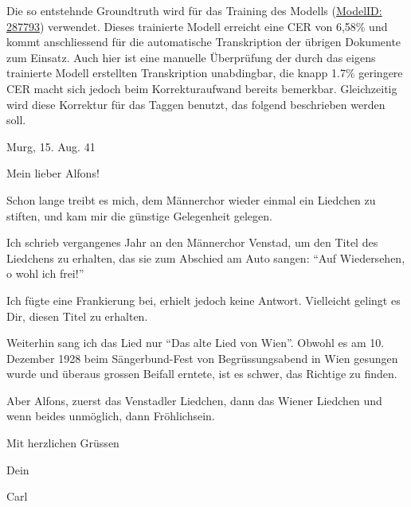 \documentclass[12pt, a4paper, ngerman, bidi=default]{article}
\let\cite\footcite
\begin{document}
\begin{minipage}[t]{0.52\textwidth}
  \justifying
  \noindent
Die so entstehnde Groundtruth wird für das Training des Modells
(\href{https://app.transkribus.org/models/public/287793}{ModelID: 287793})\footnotemark{} verwendet.
Dieses trainierte Modell erreicht eine CER von 6,58\% und kommt anschliessend für die automatische Transkription der übrigen Dokumente zum Einsatz. Auch hier ist eine manuelle Überprüfung der durch das eigens trainierte Modell erstellten
Transkription unabdingbar, die knapp 1.7\% geringere CER macht sich jedoch beim Korrekturaufwand bereits bemerkbar. Gleichzeitig wird diese Korrektur für das Taggen benutzt, das folgend beschrieben werden soll.

\end{minipage}
\footnotetext{\cite[vgl.][]{burkhardt_transkribus_2024}}
\begin{minipage}[t]{0.5\textwidth}
    \centering
    \vspace*{0cm}
  \begin{tcolorbox}[colback=oldLetter, colframe=black, sharp corners, width=0.8\textwidth]
\tiny{Murg, 15. Aug. 41

Mein lieber Alfons!

Schon lange treibt es mich, dem Männerchor wieder einmal ein Liedchen zu stiften, und kam mir die günstige Gelegenheit gelegen.

Ich schrieb vergangenes Jahr an den Männerchor Venstad, um den Titel des Liedchens zu erhalten, das sie zum Abschied am Auto sangen: \enquote{Auf Wiedersehen, o wohl ich frei!}

Ich fügte eine Frankierung bei, erhielt jedoch keine Antwort. Vielleicht gelingt es Dir, diesen Titel zu erhalten.

Weiterhin sang ich das Lied nur \enquote{Das alte Lied von Wien}. Obwohl es am 10. Dezember 1928 beim Sängerbund-Fest von Begrüssungsabend in Wien gesungen wurde und überaus grossen Beifall erntete, ist es schwer, das Richtige zu finden.

Aber Alfons, zuerst das Venstadler Liedchen, dann das Wiener Liedchen und wenn beides unmöglich, dann Fröhlichsein.

Mit herzlichen Grüssen

Dein

Carl}

\end{tcolorbox}
\end{minipage}
\hfill%
\end{document}
